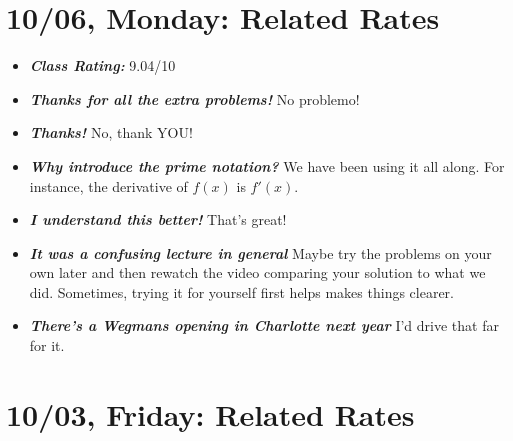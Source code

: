 \documentclass[11pt,letterpaper]{article}
\begin{document}
\newpage
\section*{10/06, Monday: Related Rates\label{10-06}}

\begin{itemize}
\item {\bfseries\itshape Class Rating:}  9.04/10

\item {\bfseries\itshape Thanks for all the extra problems!} No problemo!

\item {\bfseries\itshape Thanks!} No, thank YOU!

\item {\bfseries\itshape Why introduce the prime notation?} We have been using it all along. For instance, the derivative of $f(x)$ is $f'(x)$.

\item {\bfseries\itshape I understand this better!} That's great!

\item {\bfseries\itshape It was a confusing lecture in general} Maybe try the problems on your own later and then rewatch the video comparing your solution to what we did. Sometimes, trying it for yourself first helps makes things clearer. 

\item {\bfseries\itshape There's a Wegmans opening in Charlotte next year} I'd drive that far for it.
\end{itemize}

\newpage
\section*{10/03, Friday: Related Rates\label{10-03}}
\end{document}
